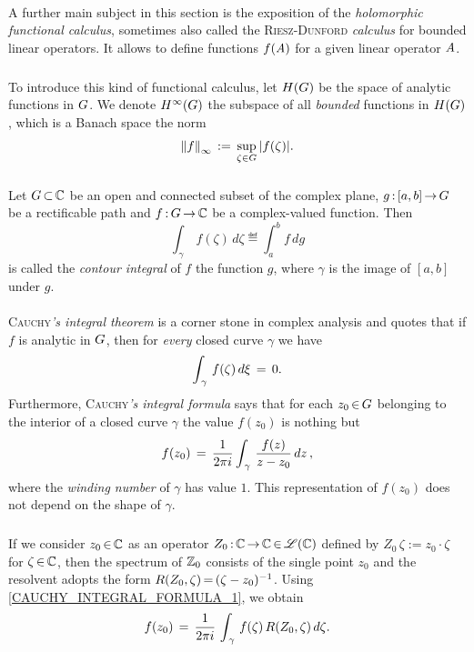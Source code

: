 \documentclass[11pt,twoside]{article}
\begin{document}
\paragraph{} %
A further main subject in this section
is the exposition of the \textit{holomorphic functional calculus},
sometimes also called the \textsc{Riesz-Dunford} \textit{calculus}
for bounded linear operators.
It allows to define functions $f(\linA)$ for a given linear operator $\linA$.

\subparagraph{}
To introduce this kind of functional calculus,
let $H(\G)$ be the space of analytic functions in $\G$.
We denote $H^{\infty}(\G)$ the subspace
of all \textit{bounded} functions in $H(\G)$,
which is a Banach space {\wrt} the norm
\[
\norm{f}_{\infty} \eqdef \sup_{\zeta \in \G} \, \abs{f(\zeta)} .
\]

\subparagraph{} %
Let $\G \xsubset \C$ be an open and connected subset of the complex plane,
$g \: [a,b] \xto \G$ be a rectificable path
and $f \: \G \xto \C$ be a complex-valued function.
Then
\[
\int_{\,\gamma} \, f(\zeta) \, d\zeta \eqdef \int_a^b f \, dg
\]
is called the \textit{contour integral} of $f$ {\wrt} the function $g$,
where $\gamma$ is the image of $[a,b]$ under $g$.

\paragraph{} %
\textsc{Cauchy}\textit{'s integral theorem} is a corner stone in
complex analysis and quotes that if $f$ is analytic in $\G$,
then
for \textit{every} closed curve $\gamma$ we have
\[
\int_{\,\gamma} \, f(\zeta) \, d\xi \= 0.
\]
Furthermore,
\textsc{Cauchy}\textit{'s integral formula} says
that for each $z_0 \xeof \G$ belonging to the interior
of a closed curve $\gamma$ the value $f(z_0)$ is nothing but
\begin{equation}\label{CAUCHY_INTEGRAL_FORMULA_1}
f(z_0) \= \frac{1}{2 \pi i} \int_{\,\gamma} \, \frac{f(z)}{z-z_0} \, dz\,,
\end{equation}
where the \textit{winding number} of $\gamma$ has value $1$.
This representation of $f(z_0)$ does not depend on the shape of $\gamma$.

\subparagraph{}
If we consider $z_0 \xeof \C$ as an operator
$Z_0 \: \C \xto \C \xeof \BO{\C}$
defined by
$Z_0 \,\zeta := z_0 \cdot \zeta$
for $\zeta \xeof \C$,
then the spectrum of $\Z_0$ consists of the single point $z_0$
and the resolvent adopts the form
$R(Z_0,\zeta) \eq (\zeta-z_0)^{-1}$.
Using \eqref{CAUCHY_INTEGRAL_FORMULA_1}, 
we obtain
\begin{equation}\label{CAUCHY_INTEGRAL_FORMULA_2}
f(z_0) \=
\frac{1}{2 \pi i} \, \int_{\,\gamma} \, f(\zeta) \, R(Z_0,\zeta) \, d\zeta.
\end{equation}
\end{document}
